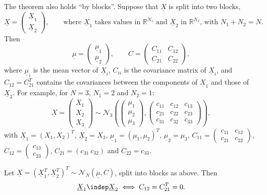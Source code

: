 The theorem also holds ``by blocks''. Suppose that $\underline X$ is split into two blocks,
\[
  \underline X=\begin{pmatrix}\underline X_1\\\underline X_2\end{pmatrix},\qquad
  \text{where $\underline X_1$ takes values in $\mathbb R^{N_1}$ and $\underline X_2$ in
  $\mathbb R^{N_2}$, with $N_1+N_2=N$.}
\]
Then
\[
  \underline\mu=\begin{pmatrix}\underline\mu_1\\\underline\mu_2\end{pmatrix},\qquad
  C=\begin{pmatrix}C_{11}&C_{12}\\C_{21}&C_{22}\end{pmatrix},
\]
where $\underline\mu_i$ is the mean vector of $\underline X_i$, $C_{ii}$ is the covariance matrix of
$\underline X_i$, and $C_{12}=C_{21}^T$ contains the covariances between the components of
$\underline X_1$ and those of $\underline X_2$. For example, for $N=3$, $N_1=2$ and $N_2=1$:
\[
  \underline X=\left(\begin{array}{c}X_1\\X_2\\\hline X_3\end{array}\right)\sim\mathcal N_3\left(
  \left(\begin{array}{c}\mu_1\\\mu_2\\\hline\mu_3\end{array}\right),
  \left(\begin{array}{cc|c}c_{11}&c_{12}&c_{13}\\c_{21}&c_{22}&c_{23}\\\hline c_{31}&c_{32}&c_{33}\end{array}\right)\right),
\]
with $\underline X_1=(X_1,X_2)^T$, $\underline X_2=X_3$, $\underline\mu_1=(\mu_1,\mu_2)^T$,
$\underline\mu_2=\mu_3$, $C_{11}=\left(\begin{smallmatrix}c_{11}&c_{12}\\c_{21}&c_{22}\end{smallmatrix}\right)$,
$C_{12}=\left(\begin{smallmatrix}c_{13}\\c_{23}\end{smallmatrix}\right)$,
$C_{21}=(c_{31}\ c_{32})$ and $C_{22}=c_{33}$.

\begin{corollary}\label{cor:gv-blocks}
Let $\underline X=(\underline X_1^T,\underline X_2^T)^T\sim\mathcal N_N(\underline\mu,C)$, split
into blocks as above. Then
\[
  \underline X_1\indep\underline X_2\iff C_{12}=C_{21}^T=0 .
\]
\end{corollary}


